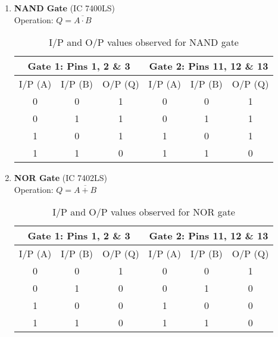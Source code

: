 \begin{enumerate}
    \item \textbf{NAND Gate} (IC 7400LS)\\
    Operation: $Q=\overline{A\cdot B}$
        \begin{table}[H]
            \centering
            \begin{tabular}{|c|c|c|c|c|c|}\hline
            \multicolumn{3}{|c|}{\textbf{Gate 1: Pins 1, 2 \& 3}} & \multicolumn{3}{c|}{\textbf{Gate 2: Pins 11, 12 \& 13}} \\ \hline
            I/P (A) & I/P (B) & O/P (Q) & I/P (A) & I/P (B) & O/P (Q) \\ \hline
            0 & 0 & 1 & 0 & 0 & 1 \\ 
            0 & 1 & 1 & 0 & 1 & 1 \\ 
            1 & 0 & 1 & 1 & 0 & 1  \\ 
            1 & 1 & 0 & 1 & 1 & 0 \\ \hline
            \end{tabular}
            \caption{I/P and O/P values observed for NAND gate}
        \end{table}

    \item \textbf{NOR Gate} (IC 7402LS)\\
    Operation: $Q=\overline{A+B}$
        \begin{table}[H]
            \centering
            \begin{tabular}{|c|c|c|c|c|c|}\hline
            \multicolumn{3}{|c|}{\textbf{Gate 1: Pins 1, 2 \& 3}} & \multicolumn{3}{c|}{\textbf{Gate 2: Pins 11, 12 \& 13}} \\ \hline
            I/P (A) & I/P (B) & O/P (Q) & I/P (A) & I/P (B) & O/P (Q) \\ \hline
            0 & 0 & 1 & 0 & 0 & 1 \\ 
            0 & 1 & 0 & 0 & 1 & 0 \\ 
            1 & 0 & 0 & 1 & 0 & 0  \\ 
            1 & 1 & 0 & 1 & 1 & 0 \\ \hline
            \end{tabular}
            \caption{I/P and O/P values observed for NOR gate}
        \end{table}
    

\end{enumerate}
